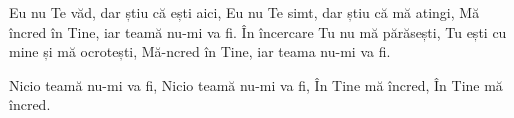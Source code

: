 \beginverse
Eu nu Te văd, dar știu că ești aici,
Eu nu Te simt, dar știu că mă atingi,
Mă încred în Tine, iar teamă nu-mi va fi.
În încercare Tu nu mă părăsești,
Tu ești cu mine și mă ocrotești,
Mă-ncred în Tine, iar teama nu-mi va fi.
\endverse

\beginchorus
Nicio teamă nu-mi va fi,
Nicio teamă nu-mi va fi,
În Tine mă încred,
În Tine mă încred.
\endchorus
\endsong